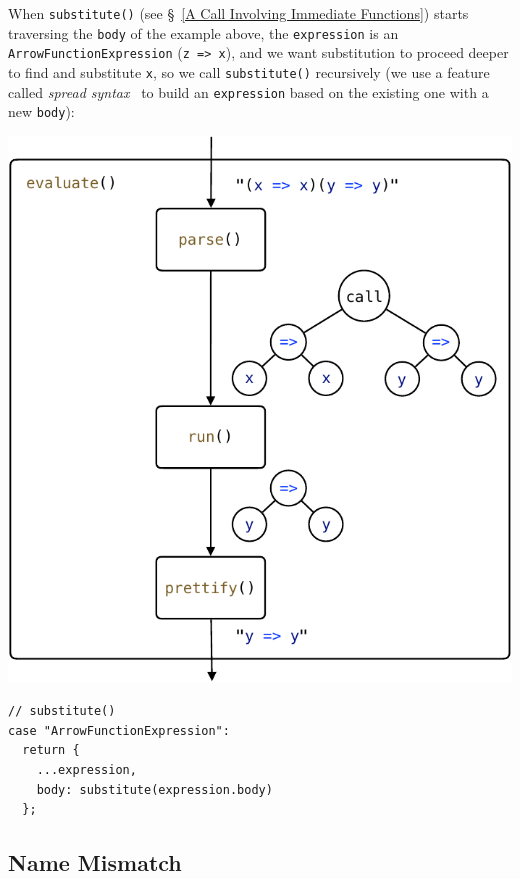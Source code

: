 \documentclass[12pt, oneside]{book}
\begin{document}
When \texttt{substitute()} (see §~\ref{A Call Involving Immediate Functions}) starts traversing the \texttt{body} of the example above, the \texttt{expression} is an \texttt{ArrowFunctionExpression} (\texttt{z => x}), and we want substitution to proceed deeper to find and substitute \texttt{x}, so we call \texttt{substitute()} recursively (we use a feature called \emph{spread syntax}~\cite{spread-syntax} to build an \texttt{expression} based on the existing one with a new \texttt{body}):

\begin{center}
\includegraphics[page = 6]{images.pdf}
\end{center}

\begin{verbatim}
// substitute()
case "ArrowFunctionExpression":
  return {
    ...expression,
    body: substitute(expression.body)
  };
\end{verbatim}

\subsection{Name Mismatch}
\end{document}

